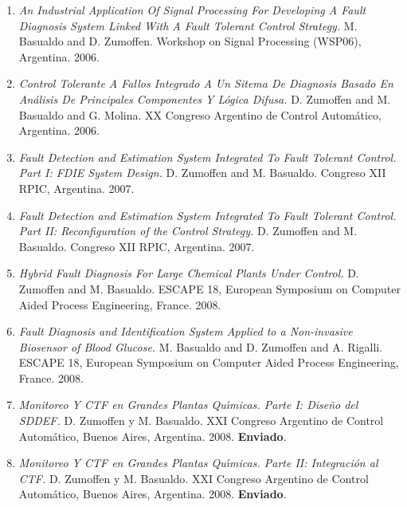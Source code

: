 \begin{enumerate}
\item \textit{An Industrial Application Of Signal Processing For Developing A Fault Diagnosis System Linked
With A Fault Tolerant Control Strategy.} M. Basualdo and D. Zumoffen. Workshop on Signal Processing
(WSP06), Argentina. 2006.

\item \textit{Control Tolerante A Fallos Integrado A Un Sitema De Diagnosis Basado En An{\'a}lisis De
Principales Componentes Y L{\'o}gica Difusa.} D. Zumoffen and M. Basualdo and G. Molina. XX  Congreso Argentino
de Control Autom{\'a}tico, Argentina. 2006.

\item \textit{Fault Detection and Estimation System Integrated To Fault Tolerant Control. Part I: FDIE
System Design.} D. Zumoffen and M. Basualdo. Congreso XII RPIC, Argentina. 2007.

\item \textit{Fault Detection and Estimation System Integrated To Fault Tolerant Control. Part II:
Reconfiguration of the Control Strategy.} D. Zumoffen and M. Basualdo. Congreso XII RPIC, Argentina. 2007.

\item \textit{Hybrid Fault Diagnosis For Large Chemical Plants Under Control.} D. Zumoffen and M. Basualdo.
ESCAPE 18, European Symposium on Computer Aided Process Engineering, France. 2008.

\item \textit{Fault Diagnosis and Identification System Applied to a Non-invasive Biosensor of Blood
Glucose.} M. Basualdo and D. Zumoffen and A. Rigalli. ESCAPE 18, European Symposium on Computer Aided
Process Engineering, France. 2008.

\item \textit{Monitoreo Y CTF en Grandes Plantas Qu{\'\i}micas. Parte I: Dise{\~n}o del SDDEF.} D. Zumoffen y M.
Basualdo. XXI Congreso Argentino de Control Autom{\'a}tico, Buenos Aires, Argentina. 2008. \textbf{Enviado}.

\item \textit{Monitoreo Y CTF en Grandes Plantas Qu{\'\i}micas. Parte II: Integraci{\'o}n al CTF.} D. Zumoffen y M.
Basualdo. XXI Congreso Argentino de Control Autom{\'a}tico, Buenos Aires, Argentina. 2008. \textbf{Enviado}.
\end{enumerate}
\normalsize

